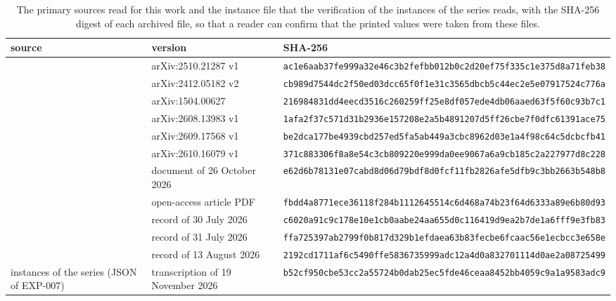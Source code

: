\begin{table}[t]
\centering\footnotesize
\begin{tabular}{@{}>{\raggedright\arraybackslash}p{3.6cm}>{\raggedright\arraybackslash}p{4.2cm}>{\raggedright\arraybackslash}p{6.2cm}@{}}
\toprule
source & version & SHA-256\\
\midrule
\cite{STVZ25} & arXiv:2510.21287 v1 & \texttt{ac1e6aab37fe999a32e46c3b2fefbb01\allowbreak 2b0c2d20ef75f335c1e375d8a71feb38}\\[2pt]
\cite{MSW25} & arXiv:2412.05182 v2 & \texttt{cb989d7544dc2f50ed03dcc65f0f1e31\allowbreak c3565dbcb5c44ec2e5e07917524c776a}\\[2pt]
\cite{SV15} & arXiv:1504.00627 & \texttt{216984831dd4eecd3516c260259ff25e\allowbreak 8df057ede4db06aaed63f5f60c93b7c1}\\[2pt]
\cite{BLRT26} & arXiv:2608.13983 v1 & \texttt{1afa2f37c571d31b2936e157208e2a5b\allowbreak 4891207d5ff26cbe7f0dfc61391ace75}\\[2pt]
\cite{Afr26} & arXiv:2609.17568 v1 & \texttt{be2dca177be4939cbd257ed5fa5ab449\allowbreak a3cbc8962d03e1a4f98c64c5dcbcfb41}\\[2pt]
\cite{CKMS26} & arXiv:2610.16079 v1 & \texttt{371c883306f8a8e54c3cb809220e999d\allowbreak a0ee9067a6a9cb185c2a227977d8c228}\\[2pt]
\cite{AFP26} & document of 26 October 2026 & \texttt{e62d6b78131e07cabd8d06d79bdf8d0f\allowbreak cf11fb2826afe5dfb9c3bb2663b548b8}\\[2pt]
\cite{MS22} & open-access article PDF & \texttt{fbdd4a8771ece36118f284b111264551\allowbreak 4c6d468a74b23f64d6333a89e6b80d93}\\[2pt]
\cite{Nik1} & record of 30 July 2026 & \texttt{c6020a91c9c178e10e1cb0aabe24aa65\allowbreak 5d0c116419d9ea2b7de1a6fff9e3fb83}\\[2pt]
\cite{Nik2} & record of 31 July 2026 & \texttt{ffa725397ab2799f0b817d329b1efdae\allowbreak a63b83fecbe6fcaac56e1ecbcc3e658e}\\[2pt]
\cite{Nik3} & record of 13 August 2026 & \texttt{2192cd1711af6c5490ffe5836735999a\allowbreak dc12a4d0a832701114d0ae2a08725499}\\[2pt]
instances of the series (JSON of EXP-007) & transcription of 19 November 2026 & \texttt{b52cf950cbe53cc2a55724b0dab25ec5\allowbreak fde46ceaa8452bb4059c9a1a9583adc9}\\[2pt]
\bottomrule
\end{tabular}
\caption{The primary sources read for this work and the instance file that the verification of the instances of the series reads, with the SHA-256 digest of each archived file, so that a reader can confirm that the printed values were taken from these files.}
\label{tab:sources}
\end{table}
